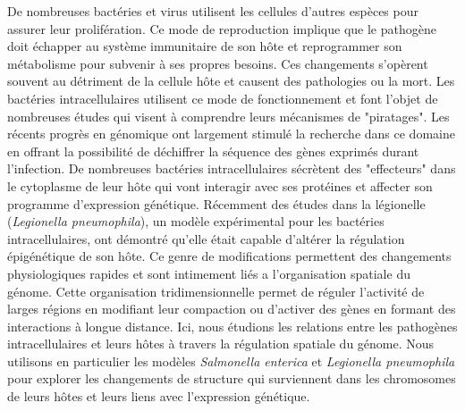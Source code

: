 De nombreuses bactéries et virus utilisent les cellules d'autres espèces pour assurer leur prolifération. Ce mode de reproduction implique que le pathogène doit échapper au système immunitaire de son hôte et reprogrammer son métabolisme pour subvenir à ses propres besoins. Ces changements s'opèrent souvent au détriment de la cellule hôte et causent des pathologies ou la mort. Les bactéries intracellulaires utilisent ce mode de fonctionnement et font l'objet de nombreuses études qui visent à comprendre leurs mécanismes de "piratages". Les récents progrès en génomique ont largement stimulé la recherche dans ce domaine en offrant la possibilité de déchiffrer la séquence des gènes exprimés durant l'infection. De nombreuses bactéries intracellulaires sécrètent des "effecteurs" dans le cytoplasme de leur hôte qui vont interagir avec ses protéines et affecter son programme d'expression génétique. Récemment des études dans la légionelle (\textit{Legionella pneumophila}), un modèle expérimental pour les bactéries intracellulaires, ont démontré qu'elle était capable d'altérer la régulation épigénétique de son hôte. Ce genre de modifications permettent des changements physiologiques rapides et sont intimement liés a l'organisation spatiale du génome. Cette organisation tridimensionnelle permet de réguler l'activité de larges régions en modifiant leur compaction ou d'activer des gènes en formant des interactions à longue distance. Ici, nous étudions les relations entre les pathogènes intracellulaires et leurs hôtes à travers la régulation spatiale du génome. Nous utilisons en particulier les modèles \textit{Salmonella enterica } et \textit{Legionella pneumophila} pour explorer les changements de structure qui surviennent dans les chromosomes de leurs hôtes et leurs liens avec l'expression génétique.
